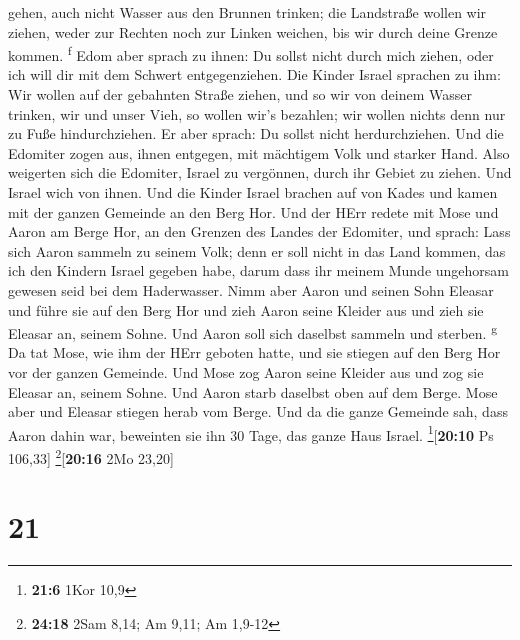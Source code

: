 gehen, auch nicht Wasser aus den Brunnen trinken; die Landstraße wollen
wir ziehen, weder zur Rechten noch zur Linken weichen, bis wir durch
deine Grenze kommen. \textsuperscript{f}  Edom aber
sprach zu ihnen: Du sollst nicht durch mich ziehen, oder ich will dir
mit dem Schwert entgegenziehen.  Die Kinder Israel
sprachen zu ihm: Wir wollen auf der gebahnten Straße ziehen, und so wir
von deinem Wasser trinken, wir und unser Vieh, so wollen wir's bezahlen;
wir wollen nichts denn nur zu Fuße hindurchziehen.  Er
aber sprach: Du sollst nicht herdurchziehen. Und die Edomiter zogen aus,
ihnen entgegen, mit mächtigem Volk und starker Hand. 
Also weigerten sich die Edomiter, Israel zu vergönnen, durch ihr Gebiet
zu ziehen. Und Israel wich von ihnen.  Und die Kinder
Israel brachen auf von Kades und kamen mit der ganzen Gemeinde an den
Berg Hor.  Und der HErr redete mit Mose und Aaron am
Berge Hor, an den Grenzen des Landes der Edomiter, und sprach:
 Lass sich Aaron sammeln zu seinem Volk; denn er soll
nicht in das Land kommen, das ich den Kindern Israel gegeben habe, darum
dass ihr meinem Munde ungehorsam gewesen seid bei dem Haderwasser.
 Nimm aber Aaron und seinen Sohn Eleasar und führe sie
auf den Berg Hor  und zieh Aaron seine Kleider aus und
zieh sie Eleasar an, seinem Sohne. Und Aaron soll sich daselbst sammeln
und sterben. \textsuperscript{g}  Da tat Mose, wie ihm
der HErr geboten hatte, und sie stiegen auf den Berg Hor vor der ganzen
Gemeinde.  Und Mose zog Aaron seine Kleider aus und zog
sie Eleasar an, seinem Sohne. Und Aaron starb daselbst oben auf dem
Berge. Mose aber und Eleasar stiegen herab vom Berge. 
Und da die ganze Gemeinde sah, dass Aaron dahin war, beweinten sie ihn
30 Tage, das ganze Haus Israel. \footnote{\textbf{21:6} 1Kor 10,9}{[}\textbf{20:10}
Ps 106,33{]} \footnote{\textbf{24:18} 2Sam 8,14; Am 9,11; Am 1,9-12}{[}\textbf{20:16}
2Mo 23,20{]}

\hypertarget{section-20}{%
\section{21}\label{section-20}}

